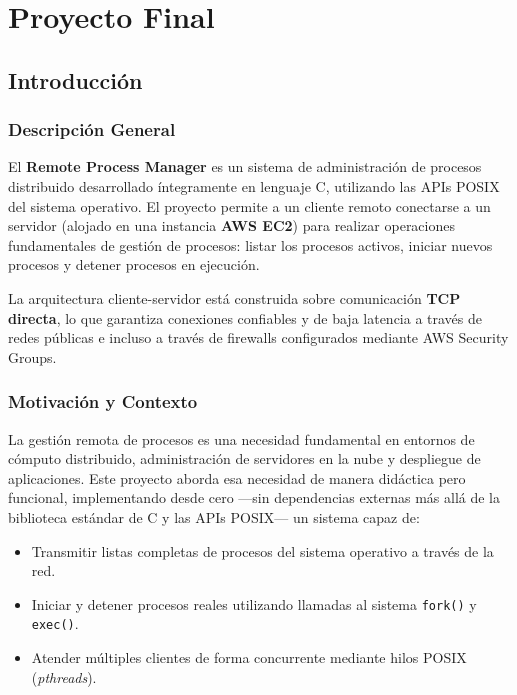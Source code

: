 \documentclass[12pt,a4paper]{report}
\begin{document}
\newpage



\part{Proyecto Final}

\chapter{Introducción}

\section{Descripción General}

El \textbf{Remote Process Manager} es un sistema de administración de procesos distribuido desarrollado íntegramente en lenguaje C, utilizando las APIs POSIX del sistema operativo. El proyecto permite a un cliente remoto conectarse a un servidor (alojado en una instancia \textbf{AWS EC2}) para realizar operaciones fundamentales de gestión de procesos: listar los procesos activos, iniciar nuevos procesos y detener procesos en ejecución.

La arquitectura cliente-servidor está construida sobre comunicación \textbf{TCP directa}, lo que garantiza conexiones confiables y de baja latencia a través de redes públicas e incluso a través de firewalls configurados mediante AWS Security Groups.

\section{Motivación y Contexto}

La gestión remota de procesos es una necesidad fundamental en entornos de cómputo distribuido, administración de servidores en la nube y despliegue de aplicaciones. Este proyecto aborda esa necesidad de manera didáctica pero funcional, implementando desde cero —sin dependencias externas más allá de la biblioteca estándar de C y las APIs POSIX— un sistema capaz de:

\begin{itemize}[leftmargin=1.5em]
  \item Transmitir listas completas de procesos del sistema operativo a través de la red.
  \item Iniciar y detener procesos reales utilizando llamadas al sistema \texttt{fork()} y \texttt{exec()}.
  \item Atender múltiples clientes de forma concurrente mediante hilos POSIX (\textit{pthreads}).
\end{itemize}
\end{document}
